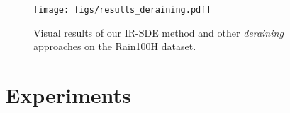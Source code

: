 \documentclass{article}
\theoremstyle{plain}
\theoremstyle{definition}
\theoremstyle{remark}
\begin{document}
\begin{table}[t]
\caption{Quantitative comparison between the proposed IR-SDE with other image deraining approaches on the Rain100L test set.}
\label{table:deraining_rain100l}
\vskip 0.05in
\begin{center}
\begin{small}
\begin{sc}
\end{sc}
\end{small}
\end{center}
\vskip -0.1in
\end{table}






 

\begin{figure}[t]
\begin{center}
\centerline{\texttt{[image: figs/results\_deraining.pdf]}}\vspace{-2.0mm}
\caption{Visual results of our IR-SDE method and other \emph{deraining} approaches on the Rain100H dataset.}
\label{fig:deraining_results}
\end{center}
\vskip -0.4in
\end{figure}

\section{Experiments}
\label{section:experiments}
\end{document}
